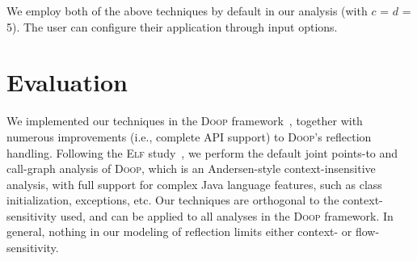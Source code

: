 We employ both of the above techniques by default in our analysis
(with $c$ = $d$ = 5). The user can configure their application
through input options.






\section{Evaluation}
\label{sec:experiments}

We implemented our techniques in the \textsc{Doop}
framework~\cite{oopsla/BravenboerS09}, together with numerous
improvements (i.e., complete API support) to
\textsc{Doop}'s reflection handling. 
Following the \textsc{Elf} study~\cite{ecoop/LiTSX14}, we perform the
default joint points-to and call-graph analysis of \textsc{Doop},
which is an Andersen-style context-insensitive analysis, with full
support for complex Java language features, such as class
initialization, exceptions, etc. Our techniques are orthogonal to the
context-sensitivity used, and can be applied to all analyses in the
\textsc{Doop} framework. In general, nothing in our modeling of
reflection limits either context- or flow-sensitivity.




